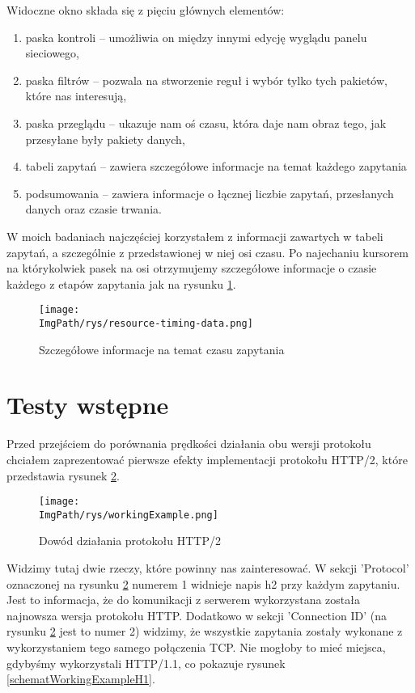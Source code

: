 \documentclass[a4paper,12pt,twoside,openany]{report}
\newcommand{\ImgPath}{.}
\begin{document}
Widoczne okno składa się z pięciu głównych elementów:
\begin{enumerate}
	\item paska kontroli -- umożliwia on między innymi edycję wyglądu panelu sieciowego,
	\item paska filtrów -- pozwala na stworzenie reguł i wybór tylko tych pakietów, które nas interesują,
	\item paska przeglądu -- ukazuje nam oś czasu, która daje nam obraz tego, jak przesyłane były pakiety danych,
	\item tabeli zapytań -- zawiera szczegółowe informacje na temat każdego zapytania
	\item podsumowania -- zawiera informacje o łącznej liczbie zapytań, przesłanych danych oraz czasie trwania.
\end{enumerate}

W moich badaniach najczęściej korzystałem z informacji zawartych w tabeli zapytań, a szczególnie z przedstawionej w niej osi czasu.
Po najechaniu kursorem na którykolwiek pasek na osi otrzymujemy szczegółowe informacje o czasie każdego z etapów zapytania jak na rysunku \ref{schematResourceTiming}.

\begin{figure}[!htbp]
	\begin{center}
\centering
\texttt{[image: \\ImgPath/rys/resource-timing-data.png]}
\end{center}
	\caption{Szczegółowe informacje na temat czasu zapytania}
	\label{schematResourceTiming}
\end{figure}

\section{Testy wstępne}

Przed przejściem do porównania prędkości działania obu wersji protokołu chciałem zaprezentować pierwsze efekty implementacji protokołu HTTP/2, które przedstawia rysunek \ref{schematWorkingExample}.

\begin{figure}[!htbp]
	\begin{center}
\centering
\texttt{[image: \\ImgPath/rys/workingExample.png]}
\end{center}
	\caption{Dowód działania protokołu HTTP/2}
	\label{schematWorkingExample}
\end{figure}

Widzimy tutaj dwie rzeczy, które powinny nas zainteresować. W sekcji 'Protocol' oznaczonej na rysunku \ref{schematWorkingExample} numerem 1 widnieje napis h2 przy każdym zapytaniu.
Jest to informacja, że do komunikacji z serwerem wykorzystana została najnowsza wersja protokołu HTTP.
Dodatkowo w sekcji 'Connection ID' (na rysunku \ref{schematWorkingExample} jest to numer 2) widzimy, że wszystkie zapytania zostały wykonane z wykorzystaniem tego samego połączenia TCP.
Nie mogłoby to mieć miejsca, gdybyśmy wykorzystali HTTP/1.1, co pokazuje rysunek \ref{schematWorkingExampleH1}.
\end{document}
